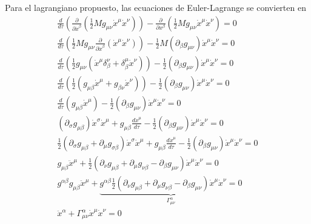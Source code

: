 Para el lagrangiano propuesto, las ecuaciones de Euler-Lagrange se convierten en
\begin{equation}
 \begin{aligned}
    \frac{d}{d\tau} \left( \frac{\partial }{\partial \dot{x}^\beta} \left(\frac{1}{2} M g_{\mu \nu} \dot{x}^\mu \dot{x}^\nu \right) \right) - \frac{\partial }{\partial x^\beta}\left(\frac{1}{2} M g_{\mu \nu} \dot{x}^\mu \dot{x}^\nu \right) = 0\\ 
    \frac{d}{d\tau} \left( \frac{1}{2} M g_{\mu \nu} \frac{\partial }{\partial \dot{x}^\beta} \left(  \dot{x}^\mu \dot{x}^\nu \right) \right) 
    - \frac{1}{2} M \left( \partial_\beta g_{\mu \nu} \right) \dot{x}^\mu \dot{x}^\nu = 0\\
    \frac{d}{d\tau} \left( \frac{1}{2}  g_{\mu \nu}  \left(  \dot{x}^\mu \delta_\beta^\nu +\delta_\beta^\mu \dot{x}^\nu \right) \right) 
    - \frac{1}{2}  \left( \partial_\beta g_{\mu \nu} \right) \dot{x}^\mu \dot{x}^\nu = 0\\
    \frac{d}{d\tau} \left( \frac{1}{2}   \left(  g_{\mu \beta} \dot{x}^\mu  + g_{\beta \nu}  \dot{x}^\nu \right) \right) 
    - \frac{1}{2}  \left( \partial_\beta g_{\mu \nu} \right) \dot{x}^\mu \dot{x}^\nu = 0\\
    \frac{d}{d\tau} \left(    g_{\mu \beta} \dot{x}^\mu \right) 
    - \frac{1}{2}  \left( \partial_\beta g_{\mu \nu} \right) \dot{x}^\mu \dot{x}^\nu = 0\\
    \left(\partial_\sigma g_{\mu \beta }\right) \dot{x}^\sigma \dot{x}^\mu+    g_{\mu \beta} \frac{d \dot{x}^\mu}{d\tau}
    - \frac{1}{2}  \left( \partial_\beta g_{\mu \nu} \right) \dot{x}^\mu \dot{x}^\nu = 0\\
    \frac{1}{2}\left(\partial_\sigma g_{\mu \beta } + \partial_\mu g_{\sigma \beta } \right) \dot{x}^\sigma \dot{x}^\mu+    g_{\mu \beta} \frac{d \dot{x}^\mu}{d\tau}
    - \frac{1}{2}  \left( \partial_\beta g_{\mu \nu} \right) \dot{x}^\mu \dot{x}^\nu = 0\\
    g_{\mu \beta}  \ddot{x}^\mu+
    \frac{1}{2}\left(\partial_\nu g_{\mu \beta } + \partial_\mu g_{\nu \beta } -  \partial_\beta g_{\mu \nu} \right) \dot{x}^\mu \dot{x}^\nu = 0\\
    g^{\alpha \beta}g_{\mu \beta}  \ddot{x}^\mu+
    \underbrace{g^{\alpha \beta}\frac{1}{2}\left(\partial_\nu g_{\mu \beta } + \partial_\mu g_{\nu \beta } -  \partial_\beta g_{\mu \nu} \right) \dot{x}^\mu \dot{x}^\nu = 0}_{\Gamma^\alpha_{\mu \nu}}\\
    \ddot{x}^\alpha + \Gamma^\alpha_{\mu \nu} \dot{x}^\mu \dot{x}^\nu = 0
 \end{aligned}   
\end{equation}

